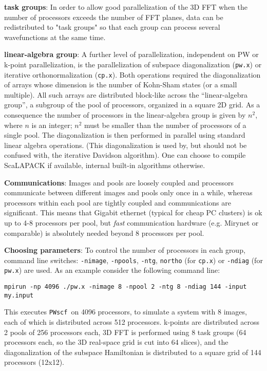 \documentclass[12pt,a4paper]{article}
\def\pwx{\texttt{pw.x}}
\def\cpx{\texttt{cp.x}}
\def\PWscf{\texttt{PWscf}}
\begin{document}
{\bf task groups}: 
In order to allow good parallelization of the 3D FFT when 
the number of processors exceeds the number of FFT planes,
data can be redistributed to "task groups" so that each group 
can process several wavefunctions at the same time.

{\bf linear-algebra group}:
A further level of parallelization, independent on
PW or k-point parallelization, is the parallelization of
subspace diagonalization (\pwx) or iterative orthonormalization
(\cpx). Both operations required the diagonalization of 
arrays whose dimension is the number of Kohn-Sham states
(or a small multiple). All such arrays are distributed block-like
across the ``linear-algebra group'', a subgroup of the pool of processors,
organized in a square 2D grid. As a consequence the number of processors
in the linear-algebra group is given by $n^2$, where $n$ is an integer;
$n^2$ must be smaller than the number of processors of a single pool.
The diagonalization is then performed
in parallel using standard linear algebra operations.
(This diagonalization is used by, but should not be confused with,
the iterative Davidson algorithm). One can choose to compile
ScaLAPACK if available, internal built-in algorithms otherwise.

{\bf Communications}:
Images and pools are loosely coupled and processors communicate
between different images and pools only once in a while, whereas
processors within each pool are tightly coupled and communications
are significant. This means that Gigabit ethernet (typical for
cheap PC clusters) is ok up to 4-8 processors per pool, but {\em fast}
communication hardware (e.g. Mirynet or comparable) is absolutely 
needed beyond 8 processors per pool.

{\bf Choosing parameters}:
To control the number of processors in each group,
command line switches: \texttt{-nimage}, \texttt{-npools},
\texttt{-ntg}, \texttt{northo} (for \cpx) or \texttt{-ndiag}
(for \pwx) are used.
As an example consider the following command line:
\begin{verbatim}
mpirun -np 4096 ./pw.x -nimage 8 -npool 2 -ntg 8 -ndiag 144 -input my.input
\end{verbatim}
This executes \PWscf\ on 4096 processors, to simulate a system
with 8 images, each of which is distributed across 512 processors.
k-points are distributed across 2 pools of 256 processors each, 
3D FFT is performed using 8 task groups (64 processors each, so
the 3D real-space grid is cut into 64 slices), and the diagonalization
of the subspace Hamiltonian is distributed to a square grid of 144
processors (12x12).
\end{document}
